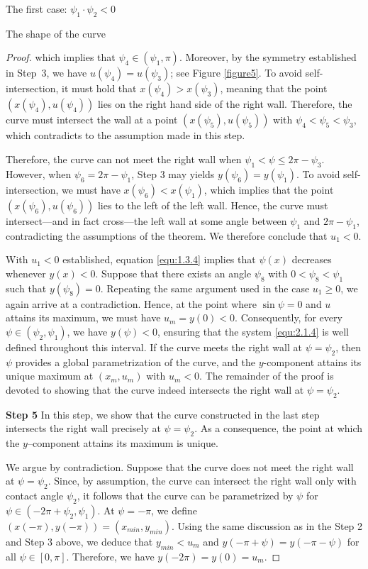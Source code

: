 \documentclass[letterpaper,reqno,10pt,twoside]{amsart}
\theoremstyle{definition}
\theoremstyle{remark}
\begin{document}
\begin{section}{The first case: $\psi_1\cdot \psi_2<0$ }
\begin{subsection}{The shape of the curve}
\begin{proof}
          \noindent which implies that $\psi_4\in(\psi_1,\pi)$. Moreover,  by the symmetry established in Step~3, we have $u(\psi_{4})=u(\psi_{3})$; see Figure \ref{figure5}. To avoid self-intersection, it must hold that $x(\psi_{4})>x(\psi_{3})$, meaning that the point $(x(\psi_{4}),u(\psi_{4}))$ lies on the right hand side of the right wall. Therefore, the curve must intersect the wall at a point $(x(\psi_{5}),u(\psi_{5}))$ with $\psi_{4}<\psi_{5}<\psi_{3}$, which contradicts to the assumption made in this step.

        Therefore, the curve can not meet the right wall when $\psi_1<\psi\leq 2\pi-\psi_3$. However, when $\psi_{6}=2\pi-\psi_1$,  Step 3 may yields $y(\psi_{6})=y(\psi_1)$. To avoid self-intersection, we must have $x(\psi_{6})<x(\psi_{1})$, which implies that the point $(x(\psi_{6}),u(\psi_{6}))$ lies to the left of the left wall. Hence, the curve must intersect—and in fact cross—the left wall at some angle between $\psi_{1}$ and $2\pi-\psi_{1}$, contradicting the assumptions of the theorem. We therefore conclude that $u_1<0$.

        
       With $u_{1}<0$ established, equation \eqref{equ:1.3.4} implies that $\psi(x)$ decreases whenever $y(x)<0$. Suppose that there exists an angle $\psi_{8}$ with $0<\psi_{8}<\psi_{1}$ such that $y(\psi_{8})=0$. Repeating the same argument used in the case $u_{1}\ge 0$, we again arrive at a contradiction. Hence, at the point where $\sin\psi=0$ and $u$ attains its maximum, we must have $u_{m}=y(0)<0$. Consequently, for every $\psi\in(\psi_{2},\psi_{1})$, we have $y(\psi)<0$, ensuring that the system \eqref{equ:2.1.4} is well defined throughout this interval. If the curve meets the right wall at $\psi=\psi_{2}$, then $\psi$ provides a global parametrization of the curve, and the $y$-component attains its unique maximum at $(x_{m},u_{m})$ with $u_{m}<0$. The remainder of the proof is devoted to showing that the curve indeed intersects the right wall at $\psi=\psi_{2}$.

       \textbf{Step 5} In this step, we show that the curve constructed in the last step intersects the right wall precisely at $\psi=\psi_{2}$. As a consequence, the point at which the $y$–component attains its maximum is unique.

       We argue by contradiction. Suppose that the curve does not meet the right wall at $\psi=\psi_{2}$. Since, by assumption, the curve can intersect the right wall only with contact angle $\psi_{2}$, it follows that the curve can be parametrized by $\psi$ for $\psi\in(-2\pi+\psi_{2},\psi_{1})$. At $\psi=-\pi$, we define $(x(-\pi),y(-\pi))=(x_{min},y_{min})$. Using the same discussion as in the Step 2 and Step 3 above, we deduce that $y_{min}<u_{m}$ and $y(-\pi+\psi)=y(-\pi-\psi)$ for all $\psi\in [0,\pi]$. Therefore, we have $y(-2\pi)=y(0)=u_{m}$. 
       

\end{proof}
\end{subsection}
\end{section}
\end{document}

